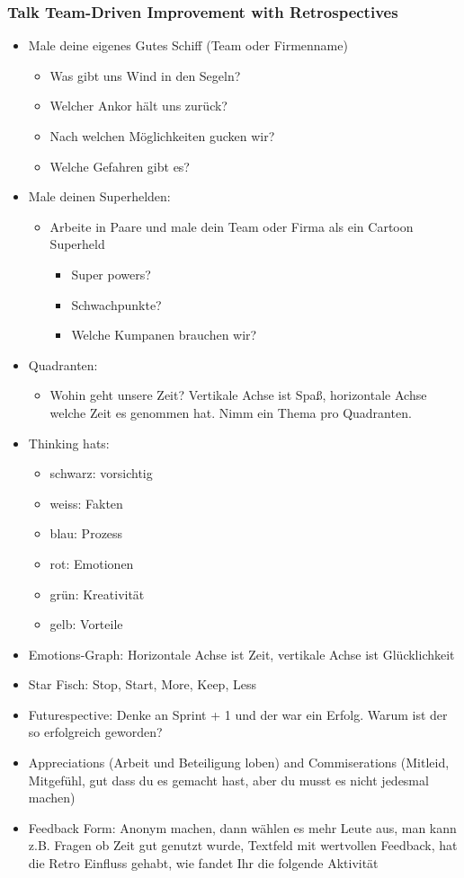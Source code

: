 \subsubsection{Talk Team-Driven Improvement with Retrospectives}
\begin{itemize}
  \item Male deine eigenes Gutes Schiff (Team oder Firmenname)
    \begin{itemize}
      \item Was gibt uns Wind in den Segeln?
      \item Welcher Ankor hält uns zurück?
      \item Nach welchen Möglichkeiten gucken wir?
      \item Welche Gefahren gibt es?
    \end{itemize}
  \item Male deinen Superhelden:
    \begin{itemize}
      \item Arbeite in Paare und male dein Team oder Firma als ein Cartoon Superheld
        \begin{itemize}
          \item Super powers?
          \item Schwachpunkte?
          \item Welche Kumpanen brauchen wir?
        \end{itemize}
    \end{itemize}
  \item Quadranten:
    \begin{itemize}
      \item Wohin geht unsere Zeit? Vertikale Achse ist Spaß, horizontale Achse welche Zeit es
        genommen hat. Nimm ein Thema pro Quadranten.
    \end{itemize}
  \item Thinking hats:
    \begin{itemize}
      \item schwarz: vorsichtig
      \item weiss: Fakten
      \item blau: Prozess
      \item rot: Emotionen
      \item grün: Kreativität
      \item gelb: Vorteile
    \end{itemize}
  \item Emotions-Graph: Horizontale Achse ist Zeit, vertikale Achse ist Glücklichkeit
  \item Star Fisch: Stop, Start, More, Keep, Less
  \item Futurespective: Denke an Sprint + 1 und der war ein Erfolg. Warum ist der so erfolgreich
    geworden?
  \item Appreciations (Arbeit und Beteiligung loben) and Commiserations (Mitleid, Mitgefühl, gut
    dass du es gemacht hast, aber du musst es nicht jedesmal machen)
  \item Feedback Form: Anonym machen, dann wählen es mehr Leute aus, man kann z.B. Fragen ob Zeit
    gut genutzt wurde, Textfeld mit wertvollen Feedback, hat die Retro Einfluss gehabt, wie
    fandet Ihr die folgende Aktivität
\end{itemize}

